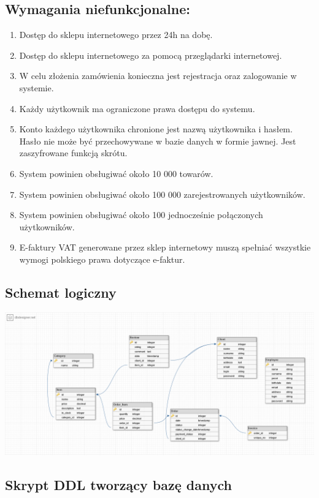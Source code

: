 \documentclass[10pt,a4paper]{article}
\begin{document}
    \subsection{Wymagania niefunkcjonalne:}
      \begin{enumerate}
	    \item Dostęp do sklepu internetowego przez 24h na dobę.
	    \item Dostęp do sklepu internetowego za pomocą przeglądarki internetowej.
		\item W celu złożenia zamówienia konieczna jest rejestracja oraz zalogowanie w systemie.
		\item Każdy użytkownik ma ograniczone prawa dostępu do systemu.
		\item Konto każdego użytkownika chronione jest nazwą użytkownika i hasłem. Hasło nie może być przechowywane w bazie 				  danych w formie jawnej. Jest zaszyfrowane funkcją skrótu.
		\item System powinien obsługiwać około 10 000 towarów.
		\item System powinien obsługiwać około 100 000 zarejestrowanych użytkowników.
		\item System powinien obsługiwać około 100 jednocześnie połączonych użytkowników.
		\item E-faktury VAT generowane przez sklep internetowy muszą spełniać wszystkie wymogi 
			  polskiego prawa dotyczące e-faktur. 
	   \end{enumerate}
	  \begin{landscape}
	  \pagestyle{empty}
      \subsection{Schemat logiczny}
        \includegraphics[scale=0.4]{schematlogiczny}
      \end{landscape}
      \newpage
      \subsection{Skrypt DDL tworzący bazę danych}
		 
	  \newpage
\end{document}
